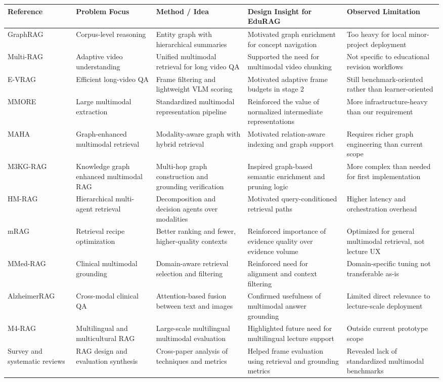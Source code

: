 \documentclass[12pt,a4paper,oneside]{report}
\begin{document}
\begin{longtable}{p{} p{} p{} p{} p{}}
\toprule
\textbf{Reference} & \textbf{Problem Focus} & \textbf{Method / Idea} & \textbf{Design Insight for EduRAG} & \textbf{Observed Limitation} \\
\midrule
GraphRAG & Corpus-level reasoning & Entity graph with hierarchical summaries & Motivated graph enrichment for concept navigation & Too heavy for local minor-project deployment \\
Multi-RAG & Adaptive video understanding & Unified multimodal retrieval for long video QA & Supported the need for multimodal video chunking & Not specific to educational revision workflows \\
E-VRAG & Efficient long-video QA & Frame filtering and lightweight VLM scoring & Motivated adaptive frame budgets in stage 2 & Still benchmark-oriented rather than learner-oriented \\
MMORE & Large multimodal extraction & Standardized multimodal representation pipeline & Reinforced the value of normalized intermediate representations & More infrastructure-heavy than our requirement \\
MAHA & Graph-enhanced multimodal retrieval & Modality-aware graph with hybrid retrieval & Motivated relation-aware indexing and graph support & Requires richer graph engineering than current scope \\
M3KG-RAG & Knowledge graph enhanced multimodal RAG & Multi-hop graph construction and grounding verification & Inspired graph-based semantic enrichment and pruning logic & More complex than needed for first implementation \\
HM-RAG & Hierarchical multi-agent retrieval & Decomposition and decision agents over modalities & Motivated query-conditioned retrieval paths & Higher latency and orchestration overhead \\
mRAG & Retrieval recipe optimization & Better ranking and fewer, higher-quality contexts & Reinforced importance of evidence quality over evidence volume & Optimized for general multimodal retrieval, not lecture UX \\
MMed-RAG & Clinical multimodal grounding & Domain-aware retrieval selection and filtering & Reinforced need for alignment and context filtering & Domain-specific tuning not transferable as-is \\
AlzheimerRAG & Cross-modal clinical QA & Attention-based fusion between text and images & Confirmed usefulness of multimodal answer grounding & Limited direct relevance to lecture-scale deployment \\
M4-RAG & Multilingual and multicultural RAG & Large-scale multilingual multimodal evaluation & Highlighted future need for multilingual lecture support & Outside current prototype scope \\
Survey and systematic reviews & RAG design and evaluation synthesis & Cross-paper analysis of techniques and metrics & Helped frame evaluation using retrieval and grounding metrics & Revealed lack of standardized multimodal benchmarks \\
\bottomrule
\end{longtable}
\end{document}
